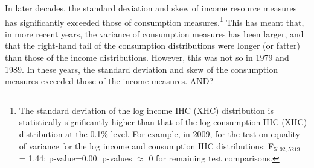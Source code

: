In later decades, the standard deviation and skew of income resource measures has significantly exceeded those of consumption measures.\footnote{The standard deviation of the log income IHC (XHC) distribution is statistically significantly higher than that of the log consumption IHC (XHC) distribution at the 0.1\% level. For example, in 2009, for the test on equality of variance for the log income and consumption IHC distributions: F$_{5192,5219}$ = 1.44; p-value=0.00. p-values $\approx$ 0 for remaining test comparisons.} This has meant that, in more recent years, the variance of consumption measures has been larger, and that the right-hand tail of the consumption distributions were longer (or fatter) than those of the income distributions. However, this was not so in 1979 and 1989. In these years, the standard deviation and skew of the consumption measures exceeded those of the income measures. AND?

